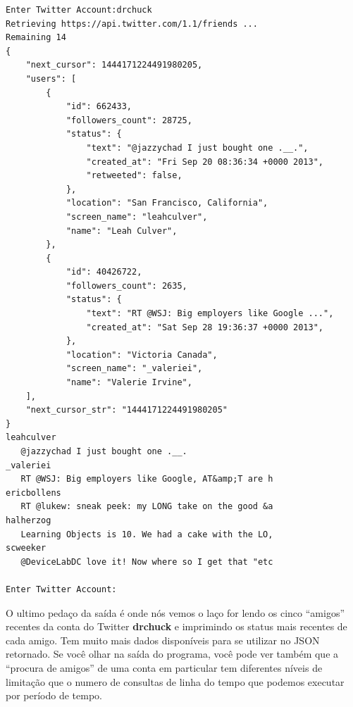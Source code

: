 \beforeverb
\begin{verbatim}
Enter Twitter Account:drchuck
Retrieving https://api.twitter.com/1.1/friends ...
Remaining 14
{
    "next_cursor": 1444171224491980205, 
    "users": [
        {
            "id": 662433, 
            "followers_count": 28725, 
            "status": {
                "text": "@jazzychad I just bought one .__.", 
                "created_at": "Fri Sep 20 08:36:34 +0000 2013", 
                "retweeted": false, 
            }, 
            "location": "San Francisco, California", 
            "screen_name": "leahculver", 
            "name": "Leah Culver", 
        }, 
        {
            "id": 40426722, 
            "followers_count": 2635, 
            "status": {
                "text": "RT @WSJ: Big employers like Google ...", 
                "created_at": "Sat Sep 28 19:36:37 +0000 2013", 
            }, 
            "location": "Victoria Canada", 
            "screen_name": "_valeriei", 
            "name": "Valerie Irvine", 
    ], 
    "next_cursor_str": "1444171224491980205"
}
leahculver
   @jazzychad I just bought one .__.
_valeriei
   RT @WSJ: Big employers like Google, AT&amp;T are h
ericbollens
   RT @lukew: sneak peek: my LONG take on the good &a
halherzog
   Learning Objects is 10. We had a cake with the LO,
scweeker
   @DeviceLabDC love it! Now where so I get that "etc

Enter Twitter Account:
\end{verbatim}
\afterverb
%
O ultimo pedaço da saída é onde nós vemos o laço for lendo os
cinco ``amigos'' recentes da conta do Twitter {\bf drchuck} e
imprimindo os status mais recentes de cada amigo. Tem muito mais dados
disponíveis para se utilizar no JSON retornado. Se você olhar na 
saída do programa, você pode ver também que a ``procura de amigos'' de
uma conta em particular tem diferentes níveis de limitação que 
o numero de consultas de linha do tempo que podemos executar por 
período de tempo.


